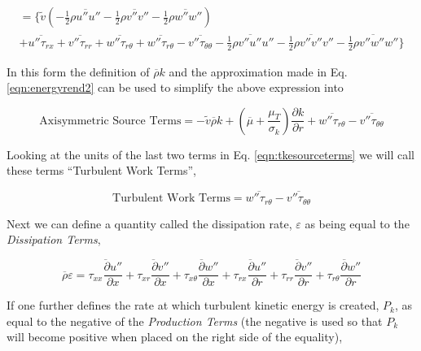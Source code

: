 \begin{displaymath}
   \begin{array}{c}
	= \Big\{\tilde v (-\frac{1}{2} \overline{\rho u'' u''} - \frac{1}{2}\overline{\rho v'' v''}
	-\frac{1}{2}\overline{\rho w'' w''}) 
	\\
	+ \overline{u''\tau_{rx}} + \overline{v''\tau_{rr}} + \overline{w''\tau_{r\theta}}
	+ \overline{w''\tau_{r\theta}} -\overline{v''\tau_{\theta \theta}}
	- \overline{\frac{1}{2} \rho v'' u'' u''} - \overline{\frac{1}{2} \rho v'' v''v''} 
	- \overline{\frac{1}{2} \rho v'' w'' w''} \Big\} 
   \end{array}
\end{displaymath}

	In this form the definition of $\overline{\rho} k$ and the approximation made in Eq. \ref{eqn:energyrend2} can be
used to simplify the above expression into

\begin{equation}
	\textrm{Axisymmetric Source Terms} = -\tilde v \overline{\rho} k
	+ (\overline{\mu} + \frac{\mu_T}{\sigma_k})\frac{\partial k}{\partial r}
	+ \overline{w''\tau_{r\theta}} - \overline{v''\tau_{\theta \theta}}
\label{eqn:tkesourceterms}
\end{equation}

	Looking at the units of the last two terms in Eq. \ref{eqn:tkesourceterms} we will call these terms ``Turbulent 
Work Terms'',

\begin{equation}
	\textrm{Turbulent Work Terms} = \overline{w''\tau_{r\theta}} - \overline{v''\tau_{\theta \theta}}
\label{eqn:tketurbworkterms}
\end{equation}

	Next we can define a quantity called the dissipation rate, $\varepsilon$ as being equal to the \emph{Dissipation
Terms},

\begin{equation}
	\overline{\rho} \varepsilon = \overline{\tau_{xx}\frac{\partial u''}{\partial x}} 
	+ \overline{\tau_{xr}\frac{\partial v''}{\partial x}} 
	+ \overline{\tau_{x\theta}\frac{\partial w''}{\partial x}} + \overline{\tau_{rx}\frac{\partial u''}{\partial r}}
	+ \overline{\tau_{rr}\frac{\partial v''}{\partial r}} + \overline{\tau_{r\theta}\frac{\partial w''}{\partial r}}
\label{eqn:dissipation}
\end{equation}

	If one further defines the rate at which turbulent kinetic energy is created, $P_k$,  as equal to the negative of
the \emph{Production Terms} (the negative is used so that $P_k$ will become positive when placed on the right side 
of the equality),


